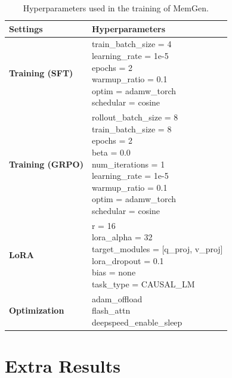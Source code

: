 \documentclass[]{fairmeta}
\begin{document}
\begin{table}[H]
\centering
\caption{Hyperparameters used in the training of MemGen.}
\label{tab:hyperparameters}
\begin{tabular}{ll}
\toprule
\textbf{Settings} & \textbf{Hyperparameters} \\
\midrule
\textbf{Training (SFT)} & \makecell[l]{train\_batch\_size = 4 \\ learning\_rate = 1e-5 \\ epochs = 2 \\ warmup\_ratio = 0.1 \\ optim = adamw\_torch \\ schedular = cosine \\} \\
\midrule
\textbf{Training (GRPO)} & \makecell[l]{rollout\_batch\_size = 8 \\ train\_batch\_size = 8 \\ epochs = 2 \\ beta = 0.0 \\ num\_iterations = 1 \\ learning\_rate = 1e-5 \\ warmup\_ratio = 0.1 \\ optim = adamw\_torch \\ schedular = cosine } \\
\midrule
\textbf{LoRA} & \makecell[l]{r = 16 \\ lora\_alpha = 32 \\ target\_modules = [q\_proj, v\_proj] \\ lora\_dropout = 0.1 \\ bias = none \\ task\_type = CAUSAL\_LM} \\
\midrule
\textbf{Optimization} & \makecell[l]{adam\_offload \\ flash\_attn \\ deepspeed\_enable\_sleep} \\
\bottomrule
\end{tabular}
\end{table}

\section{Extra Results}\label{app:result}
\end{document}
